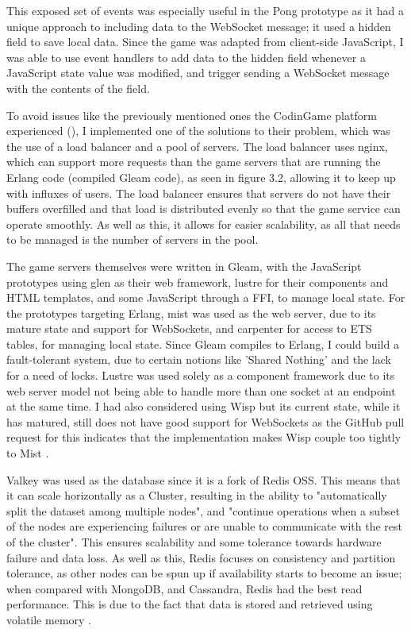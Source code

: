 \documentclass[]{final}
\begin{document}
This exposed set of events was especially useful in the Pong prototype as
it had a unique approach to including data to the WebSocket message; it used
a hidden field to save local data. Since the game was adapted from
client-side JavaScript, I was able to use event handlers to add data to the
hidden field whenever a JavaScript state value was modified, and trigger
sending a WebSocket message with the contents of the field.

To avoid issues like the previously mentioned ones the CodinGame platform
experienced {\hypersetup{linkcolor=teal}(\pageref{rationale_problem})}, I
implemented one of the
solutions to their problem, which was the use of a load balancer and a pool
of servers\cite{jobert_story_2017}. The load balancer uses nginx, which can
support more requests
than the game servers that are running the Erlang code (compiled Gleam code),
as seen in figure 3.2, allowing it to keep up with influxes of users.
The load balancer ensures that servers do not have their buffers overfilled
and that load is distributed evenly so that the game service can operate smoothly.
As well as this, it allows for easier scalability, as all that needs to be managed is the
number of servers in the pool.

The game servers themselves were written in Gleam, with the JavaScript prototypes
using glen as their web framework, lustre for their components and HTML templates,
and some JavaScript through a FFI, to manage local state. For the prototypes
targeting Erlang, mist was used as the web server, due to its mature state
and support for WebSockets, and carpenter for access to ETS tables, for managing
local state. Since Gleam compiles to Erlang, I could build a fault-tolerant
system, due to certain notions like 'Shared Nothing' and the lack for a need
of locks. Lustre was used solely as a component framework due to its web server model
not being able to handle more than one socket at an endpoint at the same time.
I had also considered using Wisp but its current state, while it has matured, still
does not have good support for WebSockets as the GitHub pull request for this indicates
that the implementation makes Wisp couple too tightly to Mist \cite{noauthor_WebSockets_nodate}.

\label{valkeyRead}

Valkey was used as the database since it is a fork of Redis OSS.
This means that it can scale horizontally as a Cluster, resulting in
the ability to "automatically split the dataset among multiple nodes", and
"continue operations when a subset of the nodes are experiencing failures
or are unable to communicate with the rest of the cluster"\cite{noauthor_scale_nodate}.
This ensures scalability and some tolerance towards hardware failure and data loss.
As well as this, Redis focuses on consistency and partition tolerance, as other nodes
can be spun up if availability starts to become an issue; when compared with
MongoDB, and Cassandra, Redis had the best read performance. This is due to the fact that data is stored and retrieved using
volatile memory \cite{department_of_information_systems_university_of_nizwa_sultanate_of_oman_study_2022}.
\end{document}
